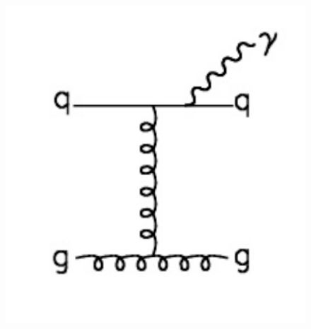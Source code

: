\documentclass[slac_one]{revtex4}
\begin{document}
\begin{figure}[h!]
{\begin{minipage}[b]{0.3\textwidth}
\includegraphics[scale=0.3]{p1j_brem.pdf}
\end{minipage}}
\qquad\qquad
{}
\end{figure}
\end{document}
